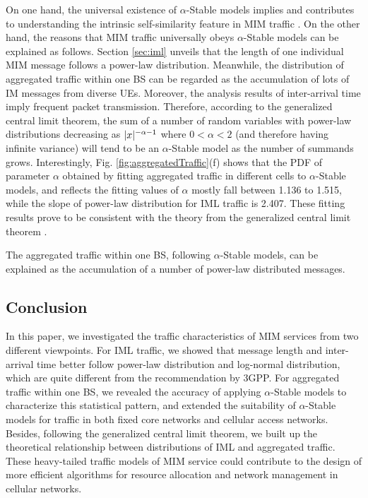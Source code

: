 On one hand, the universal existence of $\alpha$-Stable models implies and contributes to understanding the intrinsic self-similarity feature in MIM traffic \cite{crovella1997self}. On the other hand, the reasons that MIM traffic universally obeys $\alpha$-Stable models can be explained as follows. Section \ref{sec:iml} unveils that the length of one individual MIM message follows a power-law distribution. Meanwhile, the distribution of aggregated traffic within one BS can be regarded as the accumulation of lots of IM messages from diverse UEs. Moreover, the analysis results of inter-arrival time imply frequent packet transmission. Therefore, according to the generalized central limit theorem, the sum of a number of random variables with power-law distributions decreasing as $\arrowvert x \arrowvert ^{-\alpha-1}$ where $0 < \alpha < 2$ (and therefore having infinite variance) will tend to be an $\alpha$-Stable model as the number of summands grows. Interestingly, Fig. \ref{fig:aggregatedTraffic}(f) shows that the PDF of parameter $\alpha$ obtained by fitting aggregated traffic in different cells to $\alpha$-Stable models, and reflects the fitting values of $\alpha$ mostly fall between 1.136 to 1.515, while the slope of power-law distribution for IML traffic is 2.407. These fitting results prove to be consistent with the theory from the  generalized central limit theorem \cite{kolmogorov1968limit}.
\begin{remark}
The aggregated traffic within one BS, following $\alpha$-Stable models, can be explained as the accumulation of a number of power-law distributed messages.
\end{remark}
\subsection{Conclusion}
In this paper, we investigated the traffic characteristics of MIM services from two different viewpoints. For IML traffic, we showed that message length and inter-arrival time better follow power-law distribution and log-normal distribution, which are quite different from the recommendation by 3GPP. For aggregated traffic within one BS, we revealed the accuracy of applying $\alpha$-Stable models to characterize this statistical pattern, and extended the suitability of $\alpha$-Stable models for traffic in both fixed core networks and cellular access networks. Besides, following the generalized central limit theorem, we built up the theoretical relationship between distributions of IML and aggregated traffic. These heavy-tailed traffic models of MIM service could contribute to the design of more efficient algorithms for resource allocation and network management in cellular networks.

